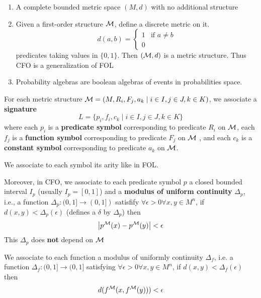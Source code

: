 \documentclass[11pt]{article}
\begin{document}
\begin{examplle}[]
\begin{enumerate}
\item A complete bounded metric space \((M,d)\) with no additional structure
\item Given a first-order structure \(\mathcal{M}\), define a discrete metric on it.
\begin{equation*}
d(a,b)=
\begin{cases}
1&\text{if }a\neq b\\
0
\end{cases}
\end{equation*}
predicates taking values in \(\{0,1\}\). Then \((\mathcal{M},d)\)  is a metric structure. Thus CFO is
a generalization of FOL
\item Probability algebras are boolean algebras of events in probabilities space.
\end{enumerate}
\end{examplle}

For each metric structure \(\mathcal{M}=(M,R_i,F_j,a_k\mid i\in I,j\in J,k\in K)\), we
associate a \textbf{signature}
\begin{equation*}
 L=\{p_i,f_i,c_k\mid i\in I,j\in J,k\in K\}
\end{equation*}
where each \(p_i\) is a \textbf{predicate symbol} corresponding to predicate \(R_i\) on \(\mathcal{M}\),
each \(f_j\) is a \textbf{function symbol} corresponding to predicate \(F_j\) on \(\mathcal{M}\) ,
and each \(c_k\) is a \textbf{constant symbol} corresponding to predicate \(a_k\) on \(\mathcal{M}\).

We associate to each symbol its arity like in FOL.

Moreover, in CFO, we associate to each predicate symbol \(p\) a closed bounded interval \(I_p\)
(usually \(I_p=[0,1]\)) and a \textbf{modulus of uniform continuity} \(\Delta_p\), i.e., a
function \(\Delta_p:(0,1]\to(0,1])\) satisfify \(\forall \epsilon>0\forall x,y\in M^n\),
if \(d(x,y)<\Delta_p(\epsilon)\) (defines a \(\delta\) by \(\Delta_p\)) then
\begin{equation*}
 \abs{p^{\calm}(x)-p^{\calm}(y)}<\epsilon
\end{equation*}
This \(\Delta_p\) does \textbf{not} depend on \(\mathcal{M}\)

We associate to each function a modulus of uniformly continuity \(\Delta_f\), i.e. a
function \(\Delta_f:(0,1]\to(0,1]\) satisfying  \(\forall \epsilon>0\forall x,y\in M^n\),
if \(d(x,y)<\Delta_f(\epsilon)\) then
\begin{equation*}
 d(f^{\mathcal{M}}(x,f^{\mathcal{M}}(y)))<\epsilon
\end{equation*}
\end{document}
